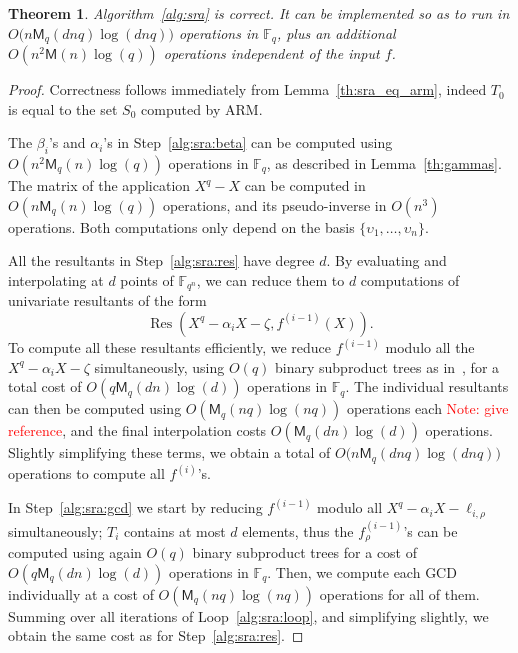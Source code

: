 \documentclass{article}
\newcommand{\ff}[1]{\mathbb{F}_{#1}}
\newcommand{\qq}{q}
\newcommand{\nn}{n}
\newcommand{\qn}{{\qq^\nn}}
\newcommand{\basef}{\ff{\qq}}
\newcommand{\extf}{\ff{\qn}}
\newcommand{\Mul}{\mathsf{M}}
\DeclareMathOperator{\Res}{Res}
\newtheorem{Theo}{Theorem}
\newcommand{\Notes}[1]{\textcolor{red}{Note: #1}}
\begin{document}
\begin{Theo}
  \label{th:sra}
  Algorithm~\ref{alg:sra} is correct. It can be implemented so as to
  run in $O\bigl(n\Mul_q(dnq)\log(dnq)\bigr)$ operations in
  $\basef$, plus an additional $O(n^2\Mul(n)\log(q))$ operations
  independent of the input $f$.
\end{Theo}
\begin{proof}
  Correctness follows immediately from Lemma~\ref{th:sra_eq_arm},
  indeed $T_0$ is equal to the set $S_0$ computed by ARM.
  
  The $\beta_i$'s and $\alpha_i$'s in Step~\ref{alg:sra:beta} can be
  computed using $O(n^2\Mul_q(n)\log(q))$ operations in $\basef$, as
  described in Lemma~\ref{th:gammas}. The matrix of the application
  $X^q-X$ can be computed in $O(n\Mul_q(n)\log(q))$ operations, and
  its pseudo-inverse in $O(n^3)$ operations. Both computations only
  depend on the basis $\{\upsilon_1,\dots,\upsilon_n\}$.

  All the resultants in Step~\ref{alg:sra:res} have degree $d$. %
  By evaluating and interpolating at $d$ points of $\extf$, we can
  reduce them to $d$ computations of univariate resultants of the form
  \[\Res(X^q - \alpha_iX - \zeta, f^{(i-1)}(X)).\]
  To compute all these resultants efficiently, we reduce $f^{(i-1)}$
  modulo all the $X^q-\alpha_iX-\zeta$ simultaneously, using $O(q)$
  binary subproduct trees as in~\cite[Lemma~10.4]{Gathen2003}, for a
  total cost of $O(q\Mul_q(dn)\log(d))$ operations in $\basef$. %
  The individual resultants can then be computed using
  $O(\Mul_q(nq)\log(nq))$ operations each \Notes{give reference}, and
  the final interpolation costs $O(\Mul_q(dn)\log(d))$ operations. %
  Slightly simplifying these terms, we obtain a total of
  $O\bigl(n\Mul_q(dnq)\log(dnq)\bigr)$ operations to
  compute all $f^{(i)}$'s.

  In Step~\ref{alg:sra:gcd} we start by reducing $f^{(i-1)}$ modulo
  all $X^{q}-\alpha_iX-\ell_{i,\rho}$ simultaneously; $T_i$ contains
  at most $d$ elements, thus the $f_\rho^{(i-1)}$'s can be computed
  using again $O(q)$ binary subproduct trees for a cost of
  $O(q\Mul_q(dn)\log(d))$ operations in $\basef$. %
  Then, we compute each GCD individually at a cost of
  $O(\Mul_q(nq)\log(nq))$ operations for all of them. %
  Summing over all iterations of Loop~\ref{alg:sra:loop}, and
  simplifying slightly, we obtain the same cost as for
  Step~\ref{alg:sra:res}.


\end{proof}
\end{document}
